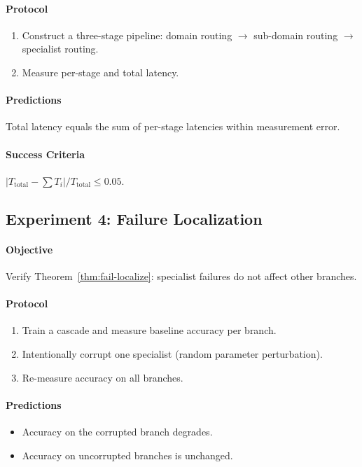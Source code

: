 \documentclass[11pt,twocolumn,a4paper]{article}
\theoremstyle{definition}
\theoremstyle{remark}
\begin{document}
\paragraph{Protocol}
\begin{enumerate}
    \item Construct a three-stage pipeline: domain routing $\to$ sub-domain routing $\to$ specialist routing.
    \item Measure per-stage and total latency.
\end{enumerate}

\paragraph{Predictions}
Total latency equals the sum of per-stage latencies within measurement error.

\paragraph{Success Criteria}
$|T_{\text{total}} - \sum T_i| / T_{\text{total}} \leq 0.05$.

\subsection{Experiment 4: Failure Localization}

\paragraph{Objective} Verify Theorem~\ref{thm:fail-localize}: specialist failures do not affect other branches.

\paragraph{Protocol}
\begin{enumerate}
    \item Train a cascade and measure baseline accuracy per branch.
    \item Intentionally corrupt one specialist (random parameter perturbation).
    \item Re-measure accuracy on all branches.
\end{enumerate}

\paragraph{Predictions}
\begin{itemize}
    \item Accuracy on the corrupted branch degrades.
    \item Accuracy on uncorrupted branches is unchanged.
\end{itemize}
\end{document}
